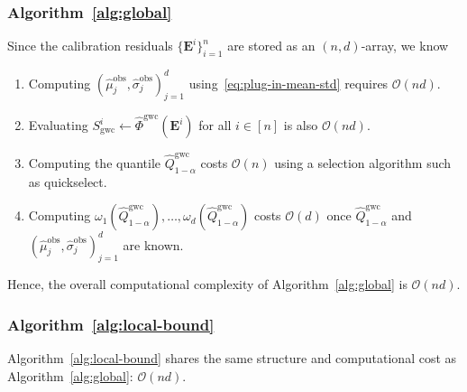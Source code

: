 \subsubsection{Algorithm~\ref{alg:global}}
\label{app:gwc-cost}
Since the calibration residuals $\{\mathbf{E}^i\}_{i=1}^{n}$ are stored as an $(n,d)$-array, we know
\begin{enumerate}
    \item Computing $(\hat\mu^{\mathrm{obs}}_j,\hat\sigma^{\mathrm{obs}}_j)_{j=1}^d$ using~\eqref{eq:plug-in-mean-std} requires $\mathcal O(nd)$.
    \item Evaluating $S^i_{\mathrm{gwc}}\gets \hat{\Phi}^{\mathrm{gwc}}(\mathbf{E}^i)$ for all $i\in[n]$ is also $\mathcal O(nd)$.
    \item Computing the quantile $\hat{Q}^{\mathrm{gwc}}_{1-\alpha}$ costs $\mathcal O(n)$ using a selection algorithm such as quickselect. 
    \item Computing $\omega_1(\hat{Q}^{\mathrm{gwc}}_{1-\alpha}),\ldots,\omega_d(\hat{Q}^{\mathrm{gwc}}_{1-\alpha})$ costs $\mathcal{O}(d)$ once $\hat{Q}^{\mathrm{gwc}}_{1-\alpha}$ and $(\hat\mu^{\mathrm{obs}}_j,\hat\sigma^{\mathrm{obs}}_j)_{j=1}^d$ are known.
\end{enumerate}
Hence, the overall computational complexity of Algorithm~\ref{alg:global} is $\mathcal O(nd)$.

\subsubsection{Algorithm~\ref{alg:local-bound}}
\label{app:lwc-local-bound}

Algorithm~\ref{alg:local-bound} shares the same structure and computational cost as Algorithm~\ref{alg:global}: $\mathcal O(nd)$.


